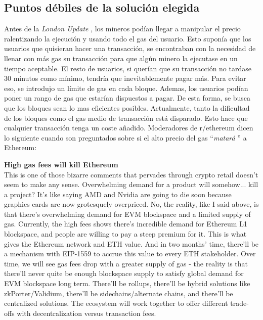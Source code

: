 \subsection{Puntos débiles de la solución elegida}
Antes de la \textit{London Update} \cite{web:london}, los mineros podían llegar a manipular el precio ralentizando la ejecución y usando todo el gas del usuario. Esto suponía que los usuarios que quisieran hacer una transacción, se encontraban con la necesidad de llenar con más gas su transacción para que algún minero la ejecutase en un tiempo aceptable. El resto de usuarios, si querían que su transacción no tardase 30 minutos como mínimo, tendría que inevitablemente pagar más.
Para evitar eso, se introdujo un límite de gas en cada bloque. Ademas, los usuarios podían poner un rango de gas que estarían dispuestos a pagar. De esta forma, se busca que los bloques sean lo mas eficientes posibles.
Actualmente, tanto la dificultad de los bloques como el gas medio de transacción está disparado\cite{web:gas_price}. Esto hace que cualquier transacción tenga un coste añadido. Moderadores de r/ethereum dicen lo siguiente cuando son preguntados sobre si el alto precio del gas ``\textit{matará} '' a Ethereum:
\begin{displayquote}
    \textbf{High gas fees will kill Ethereum}\\
    This is one of those bizarre comments that pervades through crypto retail doesn't seem to make any sense. Overwhelming demand for a product will somehow... kill a project? It's like saying AMD and Nvidia are going to die soon because graphics cards are now grotesquely overpriced.
    No, the reality, like I said above, is that there's overwhelming demand for EVM blockspace and a limited supply of gas. Currently, the high fees shows there's incredible demand for Ethereum L1 blockspace, and people are willing to pay a steep premium for it.
    This is what gives the Ethereum network and ETH value. And in two months' time, there'll be a mechanism with EIP-1559 to accrue this value to every ETH stakeholder.
    Over time, we will see gas fees drop with a greater supply of gas - the reality is that there'll never quite be enough blockspace supply to satisfy global demand for EVM blockspace long term. There'll be rollups, there'll be hybrid solutions like zkPorter/Validium, there'll be sidechains/alternate chains, and there'll be centralized solutions. The ecosystem will work together to offer different trade-offs with decentralization versus transaction fees.
    \cite{web:reddit_ethereum}
\end{displayquote}
